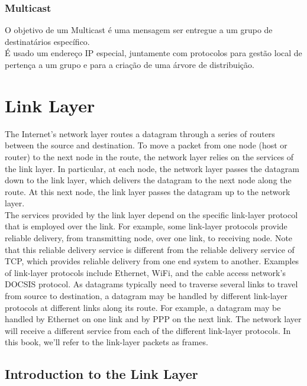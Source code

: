 \documentclass[12pt]{article}
\begin{document}
\subsubsection*{Multicast}

O objetivo de um Multicast é uma mensagem ser entregue a um grupo de destinatários específico. \\

É usado um endereço IP especial, juntamente com protocolos para gestão local de pertença a um grupo e para a criação de uma árvore de distribuição.

\newpage

\section{Link Layer}

The Internet's network layer routes a datagram through a series of routers between the source and destination. To move a packet from one node (host or router) to the next node in the route, the network layer relies on the services of the link layer. In particular, at each node, the network layer passes the datagram down to the link layer, which delivers the datagram to the next node along the route. At this next node, the link layer passes the datagram up to the network layer. 
\vspace{0.5cm} \\
The services provided by the link layer depend on the specific link-layer protocol that is employed over the link. For example, some link-layer protocols provide reliable delivery, from transmitting node, over one link, to receiving node. Note that this reliable delivery service is different from the reliable delivery service of TCP, which provides reliable delivery from one end system to another. Examples of link-layer protocols include Ethernet, WiFi, and the cable access network's DOCSIS protocol. As datagrams typically need to traverse several links to travel from source to destination, a datagram may be handled by different link-layer protocols at different links along its route. For example, a datagram may be handled by Ethernet on one link and by PPP on the next link. The network layer will receive a different service from each of the different link-layer protocols. In this book, we'll refer to the link-layer packets as
frames.

\subsection{Introduction to the Link Layer}
\end{document}
